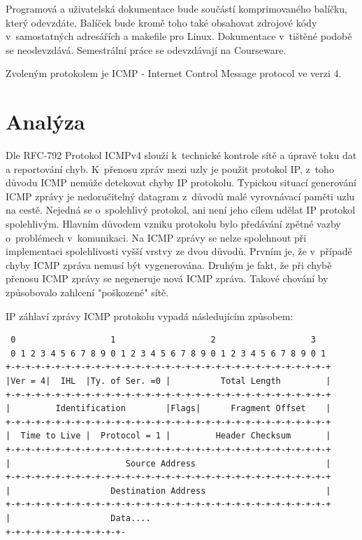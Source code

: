 \documentclass[12pt, a4paper]{article}
\begin{document}
Programová a uživatelská dokumentace bude součástí komprimovaného balíčku, který odevzdáte. Balíček bude kromě toho také obsahovat zdrojové kódy v~samostatných adresářích a makefile pro Linux. Dokumentace v~tištěné podobě se neodevzdává. Semestrální práce se odevzdávají na Courseware.

Zvoleným protokolem je ICMP - Internet Control Message protocol ve verzi 4.
\newpage

\section{Analýza}

Dle RFC-792 Protokol ICMPv4 slouží k~technické kontrole sítě a úpravě toku dat a reportování chyb. K~přenosu zpráv mezi uzly je použit protokol IP, z~toho důvodu ICMP nemůže detekovat chyby IP protokolu. Typickou situací generování ICMP zprávy je nedoručitelný datagram z~důvodů malé vyrovnávací paměti uzlu na cestě. Nejedná se o~spolehlivý protokol, ani není jeho cílem udělat IP protokol spolehlivým. Hlavním důvodem vzniku protokolu bylo předávání zpětné vazby o~problémech v~komunikaci. Na ICMP zprávy se nelze spolehnout při implementaci spolehlivosti vyšší vrstvy ze dvou důvodů. Prvním je, že v~případě chyby ICMP zpráva nemusí být vygenerována. Druhým je fakt, že při chybě přenosu ICMP zprávy se negeneruje nová ICMP zpráva. Takové chování by způsobovalo zahlcení "poškozené" sítě.

IP záhlaví zprávy ICMP protokolu vypadá následujícím způsobem:

\begin{verbatim}
 0                   1                   2                   3
 0 1 2 3 4 5 6 7 8 9 0 1 2 3 4 5 6 7 8 9 0 1 2 3 4 5 6 7 8 9 0 1
+-+-+-+-+-+-+-+-+-+-+-+-+-+-+-+-+-+-+-+-+-+-+-+-+-+-+-+-+-+-+-+-+
|Ver = 4|  IHL  |Ty. of Ser. =0 |          Total Length         |
+-+-+-+-+-+-+-+-+-+-+-+-+-+-+-+-+-+-+-+-+-+-+-+-+-+-+-+-+-+-+-+-+
|         Identification        |Flags|      Fragment Offset    |
+-+-+-+-+-+-+-+-+-+-+-+-+-+-+-+-+-+-+-+-+-+-+-+-+-+-+-+-+-+-+-+-+
|  Time to Live |  Protocol = 1 |         Header Checksum       |
+-+-+-+-+-+-+-+-+-+-+-+-+-+-+-+-+-+-+-+-+-+-+-+-+-+-+-+-+-+-+-+-+
|                       Source Address                          |
+-+-+-+-+-+-+-+-+-+-+-+-+-+-+-+-+-+-+-+-+-+-+-+-+-+-+-+-+-+-+-+-+
|                    Destination Address                        |
+-+-+-+-+-+-+-+-+-+-+-+-+-+-+-+-+-+-+-+-+-+-+-+-+-+-+-+-+-+-+-+-+
|                    Data....                                  
+-+-+-+-+-+-+-+-+-+-+-+-

\end{verbatim}
\end{document}
